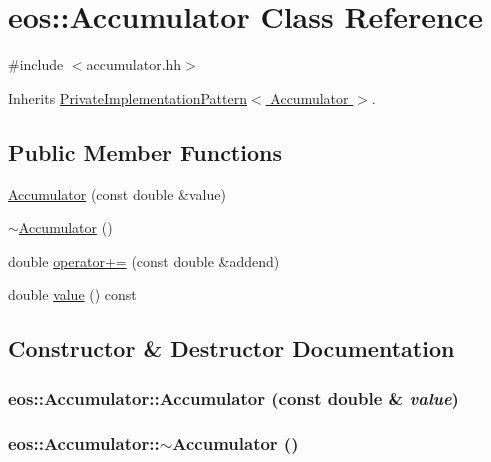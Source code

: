 \hypertarget{classeos_1_1Accumulator}{
\section{eos::Accumulator Class Reference}
\label{classeos_1_1Accumulator}
}


{\ttfamily \#include $<$accumulator.hh$>$}

Inherits \hyperlink{classeos_1_1PrivateImplementationPattern}{PrivateImplementationPattern$<$ Accumulator $>$}.\subsection*{Public Member Functions}
\begin{DoxyCompactItemize}
\item 
\hyperlink{classeos_1_1Accumulator_a0cb3aeb61f40c0aaa89f65957be8b994}{Accumulator} (const double \&value)
\item 
\hyperlink{classeos_1_1Accumulator_a8f9265ed73251d2921cdf50733d494e6}{$\sim$Accumulator} ()
\item 
double \hyperlink{classeos_1_1Accumulator_a8cbd4477f50751394afc7c445640de79}{operator+=} (const double \&addend)
\item 
double \hyperlink{classeos_1_1Accumulator_a6fc737db7b42656c0435c9d6cedb62b0}{value} () const 
\end{DoxyCompactItemize}


\subsection{Constructor \& Destructor Documentation}
\hypertarget{classeos_1_1Accumulator_a0cb3aeb61f40c0aaa89f65957be8b994}{
\subsubsection[{Accumulator}]{\setlength{\rightskip}{0pt plus 5cm}eos::Accumulator::Accumulator (const double \& {\em value})}}
\label{classeos_1_1Accumulator_a0cb3aeb61f40c0aaa89f65957be8b994}
\hypertarget{classeos_1_1Accumulator_a8f9265ed73251d2921cdf50733d494e6}{
\subsubsection[{$\sim$Accumulator}]{\setlength{\rightskip}{0pt plus 5cm}eos::Accumulator::$\sim$Accumulator ()}}
\label{classeos_1_1Accumulator_a8f9265ed73251d2921cdf50733d494e6}


